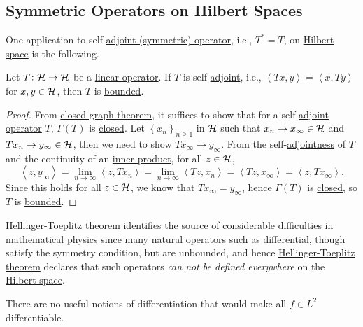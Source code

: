 \subsection{Symmetric Operators on Hilbert Spaces}
One application to self-\hyperref[def:adjoint-op]{adjoint (symmetric) operator}, i.e., \(T^{\ast} = T\), on \hyperref[def:Hilbert-space]{Hilbert space} is the following.

\begin{theorem}\label{thm:Hellinger-Toeplitz}
	Let \(T\colon \mathcal{\MakeUppercase{h}} \to \mathcal{\MakeUppercase{h}} \) be a \hyperref[def:linear-op]{linear operator}. If \(T\) is self-\hyperref[def:adjoint-op]{adjoint}, i.e., \(\left\langle Tx, y \right\rangle  = \left\langle x, Ty \right\rangle\) for \(x, y\in \mathcal{\MakeUppercase{h}} \), then \(T\) is \hyperref[rmk:bounded-op]{bounded}.
\end{theorem}
\begin{proof}
	From \hyperref[thm:closed-graph]{closed graph theorem}, it suffices to show that for a self-\hyperref[def:adjoint-op]{adjoint operator} \(T\), \(\Gamma (T)\) is \hyperref[def:closed-graph]{closed}. Let \(\left\{ x_n \right\} _{n\geq 1}\) in \(\mathcal{\MakeUppercase{h}} \) such that \(x_n \to x_\infty \in \mathcal{\MakeUppercase{h}} \) and \(Tx_n \to y_\infty \in\mathcal{\MakeUppercase{h}} \), then we need to show \(Tx_\infty \to y_\infty \). From the self-\hyperref[def:adjoint-op]{adjointness} of \(T\) and the continuity of an \hyperref[def:inner-product]{inner product}, for all \(z\in \mathcal{\MakeUppercase{h}} \),
	\[
		\left\langle z, y_\infty  \right\rangle = \lim\limits_{n \to \infty} \left\langle z, Tx_n \right\rangle = \lim\limits_{n \to \infty} \left\langle Tz, x_n \right\rangle = \left\langle Tz, x_\infty  \right\rangle = \left\langle z, Tx_\infty  \right\rangle.
	\]
	Since this holds for all \(z\in \mathcal{\MakeUppercase{h}} \), we know that \(Tx_\infty = y_\infty \), hence \(\Gamma (T)\) is \hyperref[def:closed-graph]{closed}, so \(T\) is \hyperref[rmk:bounded-op]{bounded}.
\end{proof}

\hyperref[thm:Hellinger-Toeplitz]{Hellinger-Toeplitz theorem} identifies the source of considerable difficulties in mathematical physics since many natural operators such as differential, though satisfy the symmetry condition, but are unbounded, and hence \hyperref[thm:Hellinger-Toeplitz]{Hellinger-Toeplitz theorem} declares that such operators \emph{can not be defined everywhere} on the \hyperref[def:Hilbert-space]{Hilbert space}.

\begin{eg}
	There are no useful notions of differentiation that would make all \(f\in L^2\) differentiable.
\end{eg}
